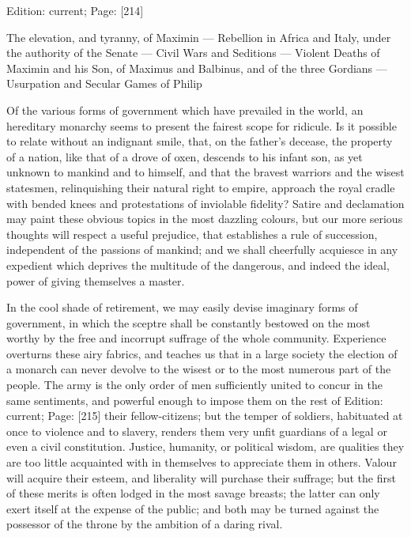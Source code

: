 Edition: current; Page: [214]


The elevation, and tyranny, of Maximin \texthebrew{—} Rebellion in Africa and Italy, under the authority of the Senate \texthebrew{—} Civil Wars and Seditions \texthebrew{—} Violent Deaths of Maximin and his Son, of Maximus and Balbinus, and of the three Gordians \texthebrew{—} Usurpation and Secular Games of Philip

Of the various forms of government which have prevailed in the world, an hereditary monarchy seems to present the fairest scope for ridicule. Is it possible to relate without an indignant smile, that, on the father\texthebrew{}’s decease, the property of a nation, like that of a drove of oxen, descends to his infant son, as yet unknown to mankind and to himself, and that the bravest warriors and the wisest statesmen, relinquishing their natural right to empire, approach the royal cradle with bended knees and protestations of inviolable fidelity? Satire and declamation may paint these obvious topics in the most dazzling colours, but our more serious thoughts will respect a useful prejudice, that establishes a rule of succession, independent of the passions of mankind; and we shall cheerfully acquiesce in any expedient which deprives the multitude of the dangerous, and indeed the ideal, power of giving themselves a master.

In the cool shade of retirement, we may easily devise imaginary forms of government, in which the sceptre shall be constantly bestowed on the most worthy by the free and incorrupt suffrage of the whole community. Experience overturns these airy fabrics, and teaches us that in a large society the election of a monarch can never devolve to the wisest or to the most numerous part of the people. The army is the only order of men sufficiently united to concur in the same sentiments, and powerful enough to impose them on the rest of Edition: current; Page: [215] their fellow-citizens; but the temper of soldiers, habituated at once to violence and to slavery, renders them very unfit guardians of a legal or even a civil constitution. Justice, humanity, or political wisdom, are qualities they are too little acquainted with in themselves to appreciate them in others. Valour will acquire their esteem, and liberality will purchase their suffrage; but the first of these merits is often lodged in the most savage breasts; the latter can only exert itself at the expense of the public; and both may be turned against the possessor of the throne by the ambition of a daring rival.

